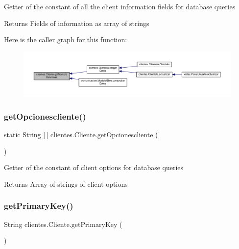 Getter of the constant of all the client information fields for database queries

\begin{DoxyReturn}{Returns}
Fields of information as array of strings 
\end{DoxyReturn}
Here is the caller graph for this function\+:\nopagebreak
\begin{figure}[H]
\begin{center}
\leavevmode
\includegraphics[width=350pt]{classclientes_1_1_cliente_aaedfb1a4a28af84fb0e22c75d0d9dfdd_icgraph}
\end{center}
\end{figure}
\mbox{\label{classclientes_1_1_cliente_ac66c36eb54668f7dead734827d61f75e}} 
\subsubsection{\texorpdfstring{get\+Opcionescliente()}{getOpcionescliente()}}
{\footnotesize\ttfamily static String \mbox{[}$\,$\mbox{]} clientes.\+Cliente.\+get\+Opcionescliente (\begin{DoxyParamCaption}{ }\end{DoxyParamCaption})\hspace{0.3cm}{\ttfamily [static]}}

Getter of the constant of client options for database queries

\begin{DoxyReturn}{Returns}
Array of strings of client options 
\end{DoxyReturn}
\mbox{\label{classclientes_1_1_cliente_afe1b2756b16dc23224805400ef1125d3}} 
\subsubsection{\texorpdfstring{get\+Primary\+Key()}{getPrimaryKey()}}
{\footnotesize\ttfamily String clientes.\+Cliente.\+get\+Primary\+Key (\begin{DoxyParamCaption}{ }\end{DoxyParamCaption})}

